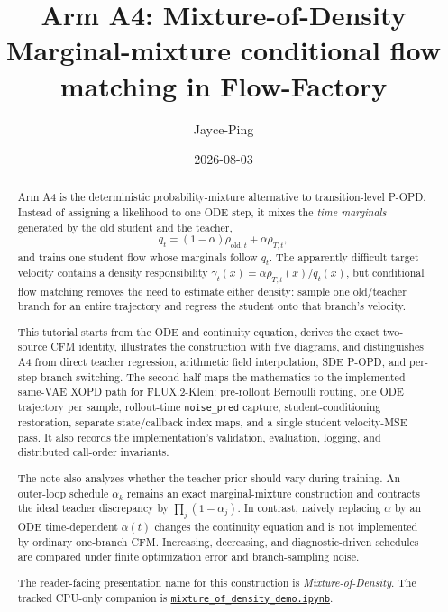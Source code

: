 \documentclass[11pt,a4paper]{article}
\title{\textbf{Arm A4: Mixture-of-Density}\\[0.35em]
\large Marginal-mixture conditional flow matching in Flow-Factory}
\author{Jayce-Ping}
\date{2026-08-03}
\theoremstyle{plain}
\theoremstyle{definition}
\begin{document}
\maketitle

\begin{abstract}
Arm A4 is the deterministic probability-mixture alternative to transition-level P-OPD.  Instead
of assigning a likelihood to one ODE step, it mixes the \emph{time marginals} generated by the old
student and the teacher,
\[
q_t=(1-\alpha)\rho_{\mathrm{old},t}+\alpha\rho_{T,t},
\]
and trains one student flow whose marginals follow $q_t$.  The apparently difficult target
velocity contains a density responsibility
$\gamma_t(x)=\alpha\rho_{T,t}(x)/q_t(x)$, but conditional flow matching removes the need to
estimate either density: sample one old/teacher branch for an entire trajectory and regress the
student onto that branch's velocity.

This tutorial starts from the ODE and continuity equation, derives the exact two-source CFM
identity, illustrates the construction with five diagrams, and distinguishes A4 from direct
teacher regression, arithmetic field interpolation, SDE P-OPD, and per-step branch switching.
The second half maps the mathematics to the implemented same-VAE XOPD path for
FLUX.2-Klein: pre-rollout Bernoulli routing, one ODE trajectory per sample, rollout-time
\texttt{noise\_pred} capture, student-conditioning restoration, separate state/callback index
maps, and a single student velocity-MSE pass.  It also records the implementation's validation,
evaluation, logging, and distributed call-order invariants.

The note also analyzes whether the teacher prior should vary during training.  An outer-loop
schedule $\alpha_k$ remains an exact marginal-mixture construction and contracts the ideal
teacher discrepancy by $\prod_j(1-\alpha_j)$.  In contrast, naively replacing $\alpha$ by an ODE
time-dependent $\alpha(t)$ changes the continuity equation and is not implemented by ordinary
one-branch CFM.  Increasing, decreasing, and diagnostic-driven schedules are compared under
finite optimization error and branch-sampling noise.

The reader-facing presentation name for this construction is \emph{Mixture-of-Density}.  The
tracked CPU-only companion is
\href{run:../../demos/mixture_of_density_demo.ipynb}
{\texttt{mixture\_of\_density\_demo.ipynb}}.
\end{abstract}

\tableofcontents
\newpage
\end{document}
